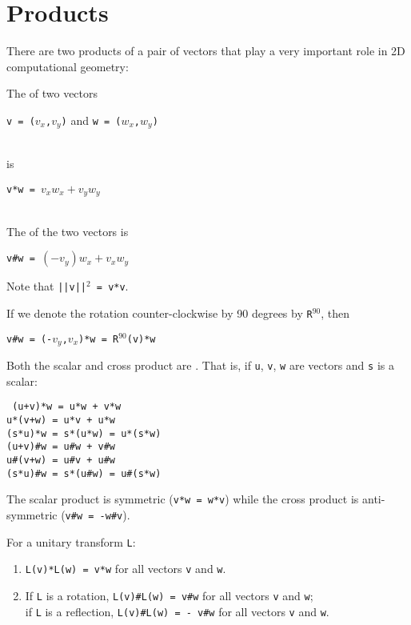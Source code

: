 \documentclass[12pt]{article}
\begin{document}
\newpage

\section{Products}
There are two products of a pair of vectors that play a
very important role in 2D computational geometry:

\begin{definition}
The  of two vectors \\
\centerline{{\tt v = ($v_x$,$v_y$)} and {\tt w = ($w_x$,$w_y$)}} \\
is \\
\centerline{\tt v*w = $v_x w_x + v_y w_y$} \\
The  of the two vectors is \\
\centerline{\tt v\#w = $(-v_y)w_x + v_x w_y$}
\end{definition}

Note that {\tt ||v||$^2$ = v*v}.

If we denote the rotation counter-clockwise by 90 degrees by {\tt R}$^{90}$,
then \\
\centerline{\tt v\#w = (-$v_y$,$v_x$)*w = R$^{90}$(v)*w}

Both the scalar and cross product are .  That is,
if {\tt u}, {\tt v}, {\tt w} are vectors and {\tt s} is a scalar:
\begin{center}
\tt
(u+v)*w = u*w + v*w \\
u*(v+w) = u*v + u*w \\
(s*u)*w = s*(u*w) = u*(s*w) \\
(u+v)\#w = u\#w + v\#w \\
u\#(v+w) = u\#v + u\#w \\
(s*u)\#w = s*(u\#w) = u\#(s*w)
\end{center}

The scalar product is symmetric ({\tt v*w = w*v})
while the cross product is anti-symmetric ({\tt v\#w = -w\#v}).

\begin{lemma}
For a unitary transform {\tt L}:
\begin{enumerate}
\item {\tt L(v)*L(w) = v*w} for all vectors {\tt v} and {\tt w}.
\item If {\tt L} is a rotation,
         {\tt L(v)\#L(w) = v\#w} for all vectors {\tt v} and {\tt w}; \\
      if {\tt L} is a reflection,
         {\tt L(v)\#L(w) = - v\#w} for all vectors {\tt v} and {\tt w}.
\end{enumerate}
\end{lemma}
\end{document}

